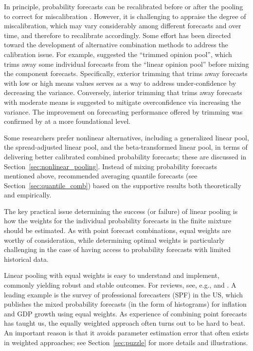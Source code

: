 \documentclass[11pt]{article}
\begin{document}
In principle, probability forecasts can be recalibrated before or after the pooling to correct for miscalibration \citep{Turner2014-za}. However, it is challenging to appraise the degree of miscalibration, which may vary considerably among different forecasts and over time, and therefore to recalibrate accordingly. Some effort has been directed toward the development of alternative combination methods to address the calibration issue. For example, \citet{Jose2014-uh} suggested the ``trimmed opinion pool'', which trims away some individual forecasts from the ``linear opinion pool'' before mixing the component forecasts. Specifically, exterior trimming that trims away forecasts with low or high means values serves as a way to address under-confidence by decreasing the variance. Conversely, interior trimming that trims away forecasts with moderate means is suggested to mitigate overconfidence via increasing the variance. The improvement on forecasting performance offered by trimming was confirmed by \citet{Grushka-Cockayne2017-dj} at a more foundational level. 

Some researchers prefer nonlinear alternatives, including a generalized linear pool, the spread-adjusted linear pool, and the beta-transformed linear pool, in terms of delivering better calibrated combined probability forecasts; these are discussed in Section~\ref{sec:nonlinear_pooling}. Instead of mixing probability forecasts mentioned above, \citet{Lichtendahl2013-rt} recommended averaging quantile forecasts (see Section~\ref{sec:quantile_comb}) based on the supportive results both theoretically and empirically.

The key practical issue determining the success (or failure) of linear pooling is how the weights for the individual probability forecasts in the finite mixture should be estimated. As with point forecast combinations, equal weights are worthy of consideration, while determining optimal weights is particularly challenging in the case of having access to probability forecasts with limited historical data. 

Linear pooling with equal weights is easy to understand and implement, commonly yielding robust and stable outcomes. For reviews, see, e.g., \citet{Wallis2005-yf} and \citet{OHagan2006-jk}. A leading example is the survey of professional forecasters (SPF) in the US, which publishes the mixed probability forecasts (in the form of histograms) for inflation and GDP growth using equal weights. As experience of combining point forecasts has taught us, the equally weighted approach often turns out to be hard to beat. An important reason is that it avoids parameter estimation error that often exists in weighted approaches; see Section~\ref{sec:puzzle} for more details and illustrations.
\end{document}
